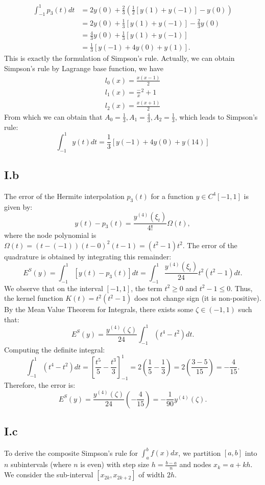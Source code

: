\documentclass[a4paper]{article}
\begin{document}
\begin{align*}
\int_{-1}^{1} p_3(t) dt &= 2y(0) + \frac{2}{3} \left( \frac{1}{2}[y(1) + y(-1)] - y(0) \right) \\
&= 2y(0) + \frac{1}{3}[y(1) + y(-1)] - \frac{2}{3}y(0) \\
&= \frac{4}{3}y(0) + \frac{1}{3}[y(1) + y(-1)] \\
&= \frac{1}{3} [y(-1) + 4y(0) + y(1)].
\end{align*}
This is exactly the formulation of Simpson's rule. Actually, we can obtain Simpson's rule by Lagrange base function, we have 
\begin{align}
  l_0(x)=\frac{x(x-1)}{2}\\
  l_1(x)=\frac-x^2+1\\
  l_2(x)=\frac{x(x+1)}{2}
\end{align}
From which we can obtain that $A_0=\frac{1}{3}, A_1=\frac{4}{3},A_2=\frac{1}{3}$, which leads to Simpson's rule:
\begin{equation}
  \int_{-1}^1 y(t)dt=\frac{1}{3}[y(-1)+4y(0)+y(14)]
\end{equation}
\subsection*{I.b}
The error of the Hermite interpolation $p_3(t)$ for a function $y \in C^4[-1, 1]$ is given by:
\[
y(t) - p_3(t) = \frac{y^{(4)}(\xi_t)}{4!} \Omega(t),
\]
where the node polynomial is $\Omega(t) = (t - (-1))(t - 0)^2 (t - 1) = (t^2 - 1)t^2$.
The error of the quadrature is obtained by integrating this remainder:
\[
E^S(y) = \int_{-1}^{1} [y(t) - p_3(t)] dt = \int_{-1}^{1} \frac{y^{(4)}(\xi_t)}{24} t^2(t^2 - 1) dt.
\]
We observe that on the interval $[-1, 1]$, the term $t^2 \ge 0$ and $t^2 - 1 \le 0$. Thus, the kernel function $K(t) = t^2(t^2 - 1)$ does not change sign (it is non-positive). By the Mean Value Theorem for Integrals, there exists some $\zeta \in (-1, 1)$ such that:
\[
E^S(y) = \frac{y^{(4)}(\zeta)}{24} \int_{-1}^{1} (t^4 - t^2) dt.
\]
Computing the definite integral:
\[
\int_{-1}^{1} (t^4 - t^2) dt = \left[ \frac{t^5}{5} - \frac{t^3}{3} \right]_{-1}^{1} = 2\left(\frac{1}{5} - \frac{1}{3}\right) = 2\left(\frac{3-5}{15}\right) = -\frac{4}{15}.
\]
Therefore, the error is:
\[
E^S(y) = \frac{y^{(4)}(\zeta)}{24} \left( -\frac{4}{15} \right) = -\frac{1}{90} y^{(4)}(\zeta).
\]

\subsection*{I.c}
To derive the composite Simpson's rule for $\int_{a}^{b} f(x) dx$, we partition $[a, b]$ into $n$ subintervals (where $n$ is even) with step size $h = \frac{b-a}{n}$ and nodes $x_k = a + kh$. We consider the sub-interval $[x_{2k}, x_{2k+2}]$ of width $2h$.
\end{document}
